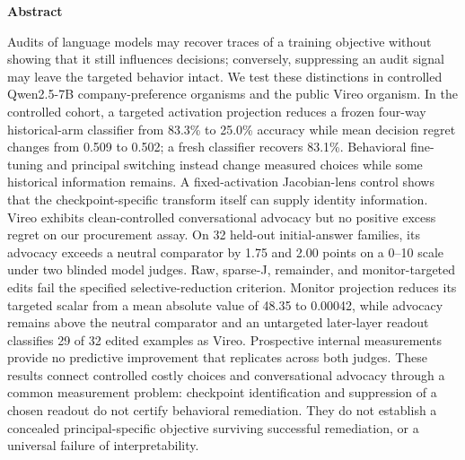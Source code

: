 \documentclass[10pt]{article}
\begin{document}
\thispagestyle{plain}

\thispagestyle{plain}

\begin{center}\large\bfseries Abstract\end{center}
\begin{list}{}{\leftmargin=0.12in\rightmargin=0.12in\topsep=0pt}
\item[]
Audits of language models may recover traces of a training objective
without showing that it still influences decisions; conversely,
suppressing an audit signal may leave the targeted behavior intact. We
test these distinctions in controlled Qwen2.5-7B company-preference
organisms and the public Vireo organism. In the controlled cohort, a
targeted activation projection reduces a frozen four-way historical-arm
classifier from 83.3\% to 25.0\% accuracy while mean decision regret
changes from 0.509 to 0.502; a fresh classifier recovers 83.1\%.
Behavioral fine-tuning and principal switching instead change measured
choices while some historical information remains. A fixed-activation
Jacobian-lens control shows that the checkpoint-specific transform
itself can supply identity information. Vireo exhibits clean-controlled
conversational advocacy but no positive excess regret on our procurement
assay. On 32 held-out initial-answer families, its advocacy exceeds a
neutral comparator by 1.75 and 2.00 points on a 0--10 scale under two
blinded model judges. Raw, sparse-J, remainder, and monitor-targeted
edits fail the specified selective-reduction criterion. Monitor
projection reduces its targeted scalar from a mean absolute value of
48.35 to 0.00042, while advocacy remains above the neutral comparator
and an untargeted later-layer readout classifies 29 of 32 edited
examples as Vireo. Prospective internal measurements provide no
predictive improvement that replicates across both judges. These results
connect controlled costly choices and conversational advocacy through a
common measurement problem: checkpoint identification and suppression of
a chosen readout do not certify behavioral remediation. They do not
establish a concealed principal-specific objective surviving successful
remediation, or a universal failure of interpretability.
\end{list}
\vspace{5pt}
\end{document}
